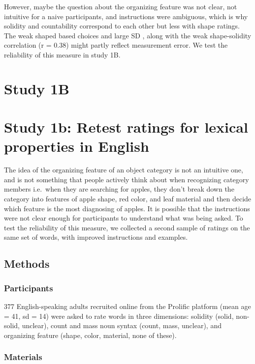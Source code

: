 \documentclass[
  american,
  man,floatsintext]{apa6}
\begin{document}
However, maybe the question about the organizing feature was not clear, not intuitive for a naive participants, and instructions were ambiguous, which is why solidity and countability correspond to each other but less with shape ratings. The weak shaped based choices and large SD , along with the weak shape-solidity correlation (r = 0.38) might partly reflect measurement error. We test the reliability of this measure in study 1B.

\section{Study 1B}\label{study-1b}

\section{Study 1b: Retest ratings for lexical properties in English}\label{study-1b-retest-ratings-for-lexical-properties-in-english}

The idea of the organizing feature of an object category is not an intuitive one, and is not something that people actively think about when recognizing category members i.e.~when they are searching for apples, they don't break down the category into features of apple shape, red color, and leaf material and then decide which feature is the most diagnosing of apples. It is possible that the instructions were not clear enough for participants to understand what was being asked. To test the reliability of this measure, we collected a second sample of ratings on the same set of words, with improved instructions and examples.

\subsection{Methods}\label{methods-1}

\subsubsection{Participants}\label{participants-1}

377 English-speaking adults recruited online from the Prolific platform (mean age = 41, sd = 14) were asked to rate words in three dimensions: solidity (solid, non-solid, unclear), count and mass noun syntax (count, mass, unclear), and organizing feature (shape, color, material, none of these).

\subsubsection{Materials}\label{materials-1}
\end{document}
